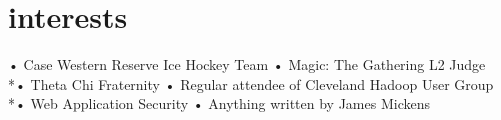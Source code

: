 \documentclass[]{friggeri-cv}
\begin{document}
\section{interests}
•	Case Western Reserve Ice Hockey Team
•	Magic: The Gathering L2 Judge
\\*•	Theta Chi Fraternity
•	Regular attendee of Cleveland Hadoop User Group
\\*•	Web Application Security
•	Anything written by James Mickens
% 
\end{document}
